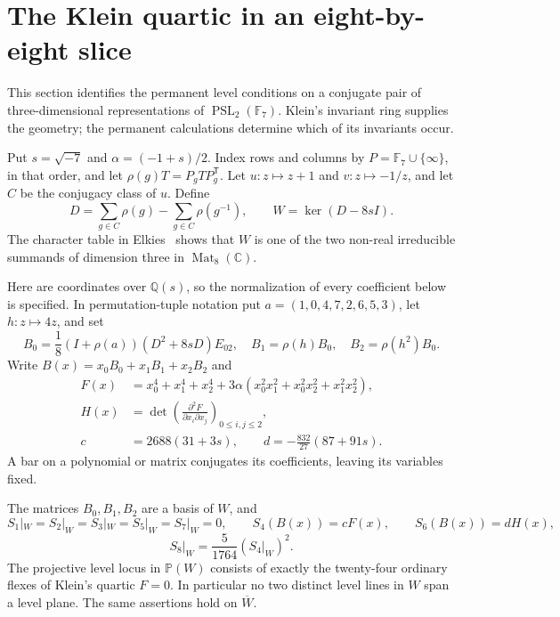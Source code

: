 \section{The Klein quartic in an eight-by-eight slice}
\label{sec:klein}
This section identifies the permanent level conditions on a conjugate pair of three-dimensional representations of $\operatorname{PSL}_2(\mathbb F_7)$. Klein's invariant ring supplies the geometry; the permanent calculations determine which of its invariants occur.

Put $s=\sqrt{-7}$ and $\alpha=(-1+s)/2$. Index rows and columns by
$P=\mathbb F_7\cup\{\infty\}$, in that order, and let
$\rho(g)T=P_gTP_g^{\mathsf T}$. Let $u:z\mapsto z+1$ and
$v:z\mapsto-1/z$, and let $C$ be the conjugacy class of $u$. Define
\[
 D=\sum_{g\in C}\rho(g)-\sum_{g\in C}\rho(g^{-1}),\qquad
 W=\ker(D-8sI).
\]
The character table in Elkies~\cite[\S1.1, p.~53, (1.1)]{Elkies1999}
shows that $W$ is one of the two non-real irreducible summands of dimension three in $\operatorname{Mat}_8(\mathbb C)$.

Here are coordinates over $\mathbb Q(s)$, so the normalization of every coefficient below is specified. In permutation-tuple notation put
$a=(1,0,4,7,2,6,5,3)$, let $h:z\mapsto4z$, and set
\[
 B_0=\frac18(I+\rho(a))(D^2+8sD)E_{02},\quad
 B_1=\rho(h)B_0,\quad B_2=\rho(h^2)B_0.
\]
Write $B(x)=x_0B_0+x_1B_1+x_2B_2$ and
\begin{align*}
 F(x)&=x_0^4+x_1^4+x_2^4
       +3\alpha(x_0^2x_1^2+x_0^2x_2^2+x_1^2x_2^2),\\
 H(x)&=\det\left(\frac{\partial^2F}{\partial x_i\partial x_j}\right)_{0\leq i,j\leq2},\\
 c&=2688(31+3s),\qquad d=-\frac{832}{27}(87+91s).
\end{align*}
A bar on a polynomial or matrix conjugates its coefficients, leaving its variables fixed.

\begin{theorem}\label{thm:klein-pure}
The matrices $B_0,B_1,B_2$ are a basis of $W$, and
\[
 S_1|_W=S_2|_W=S_3|_W=S_5|_W=S_7|_W=0,
 \qquad S_4(B(x))=cF(x),\qquad S_6(B(x))=dH(x),
\]
\[
 S_8|_W=\frac5{1764}(S_4|_W)^2.
\]
The projective level locus in $\mathbb P(W)$ consists of exactly the twenty-four ordinary flexes of Klein's quartic $F=0$. In particular no two distinct level lines in $W$ span a level plane. The same assertions hold on $\overline W$.
\end{theorem}

